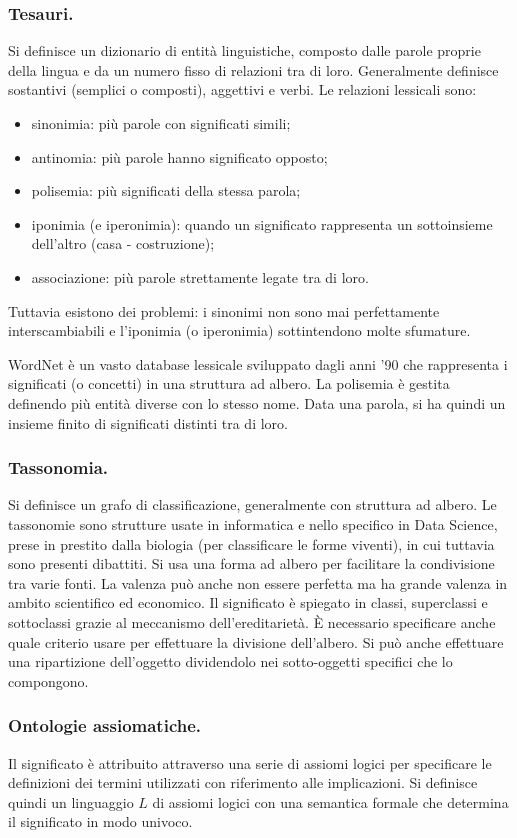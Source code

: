 \documentclass[11pt]{article}
\begin{document}
\begin{multicols}{2}
\subsubsection{Tesauri.}
Si definisce un dizionario di entità linguistiche, composto dalle parole proprie della lingua e da un numero fisso di relazioni tra di loro.
Generalmente definisce sostantivi (semplici o composti), aggettivi e verbi.
Le relazioni lessicali sono:
\begin{itemize}
  \item sinonimia: più parole con significati simili;
  \item antinomia: più parole hanno significato opposto;
  \item polisemia: più significati della stessa parola;
  \item iponimia (e iperonimia): quando un significato rappresenta un sottoinsieme dell'altro (casa - costruzione);
  \item associazione: più parole strettamente legate tra di loro.
\end{itemize}
Tuttavia esistono dei problemi: i sinonimi non sono mai perfettamente interscambiabili e l'iponimia (o iperonimia) sottintendono molte sfumature.

WordNet è un vasto database lessicale sviluppato dagli anni '90 che rappresenta i significati (o concetti) in una struttura ad albero.
La polisemia è gestita definendo più entità diverse con lo stesso nome.
Data una parola, si ha quindi un insieme finito di significati distinti tra di loro.

\subsubsection{Tassonomia.}
Si definisce un grafo di classificazione, generalmente con struttura ad albero.
Le tassonomie sono strutture usate in informatica e nello specifico in Data Science, prese in prestito dalla biologia (per classificare le forme viventi), in cui tuttavia sono presenti dibattiti.
Si usa una forma ad albero per facilitare la condivisione tra varie fonti.
La valenza può anche non essere perfetta ma ha grande valenza in ambito scientifico ed economico.
Il significato è spiegato in classi, superclassi e sottoclassi grazie al meccanismo dell'ereditarietà.
È necessario specificare anche quale criterio usare per effettuare la divisione dell'albero.
Si può anche effettuare una ripartizione dell'oggetto dividendolo nei sotto-oggetti specifici che lo compongono.

\subsubsection{Ontologie assiomatiche.}
Il significato è attribuito attraverso una serie di assiomi logici per specificare le definizioni dei termini utilizzati con riferimento alle implicazioni.
Si definisce quindi un linguaggio $L$ di assiomi logici con una semantica formale che determina il significato in modo univoco.


\end{multicols}
\end{document}
